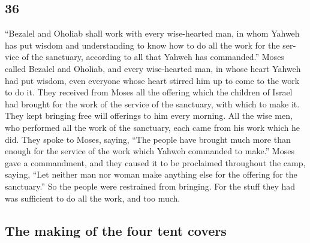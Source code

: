 \begin{paracol}{2}
\switchcolumn
\begin{otherlanguage}{english}

\hypertarget{section-71}{%
\section{36}\label{section-71}}

 ``Bezalel and Oholiab shall work with every wise-hearted
man, in whom Yahweh has put wisdom and understanding to know how to do
all the work for the service of the sanctuary, according to all that
Yahweh has commanded.''  Moses called Bezalel and Oholiab,
and every wise-hearted man, in whose heart Yahweh had put wisdom, even
everyone whose heart stirred him up to come to the work to do it.
 They received from Moses all the offering which the
children of Israel had brought for the work of the service of the
sanctuary, with which to make it. They kept bringing free will offerings
to him every morning.  All the wise men, who performed all
the work of the sanctuary, each came from his work which he did.
 They spoke to Moses, saying, ``The people have brought
much more than enough for the service of the work which Yahweh commanded
to make.''  Moses gave a commandment, and they caused it
to be proclaimed throughout the camp, saying, ``Let neither man nor
woman make anything else for the offering for the sanctuary.'' So the
people were restrained from bringing.  For the stuff they
had was sufficient to do all the work, and too much.

\hypertarget{the-making-of-the-four-tent-covers}{%
\subsection{The making of the four tent
covers}\label{the-making-of-the-four-tent-covers}}


\end{otherlanguage}
\end{paracol}
